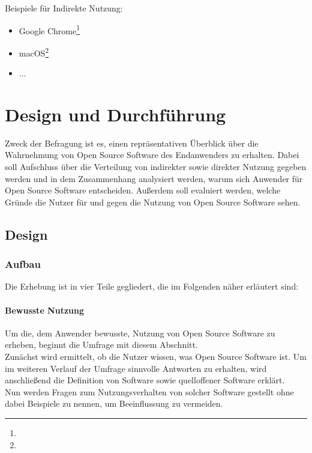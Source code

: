 \documentclass[a4paper]{article}
\begin{document}
                    Beispiele für Indirekte Nutzung:
                    \begin{itemize}
                        \item Google Chrome\footnote{}
                        \item macOS\footnote{}
                        \item ... %
                    \end{itemize}

            
        
    \section{Design und Durchführung}
		Zweck der Befragung ist es, einen repräsentativen Überblick über die Wahrnehmung von Open Source Software des Endanwenders zu erhalten. Dabei soll Aufschluss über die Verteilung von indirekter sowie direkter Nutzung gegeben werden und in dem Zusammenhang analysiert werden, warum sich Anwender für Open Source Software entscheiden. Außerdem soll evaluiert werden, welche Gründe die Nutzer für und gegen die Nutzung von Open Source Software sehen.
	
		\subsection{Design}
		  \subsubsection{Aufbau}
    			Die Erhebung ist in vier Teile gegliedert, die im Folgenden näher erläutert sind: 
    		   
    			\paragraph{Bewusste Nutzung}
    				Um die, dem Anwender bewusste, Nutzung von Open Source Software zu erheben, beginnt die Umfrage mit diesem Abschnitt.\\
    				Zunächst wird ermittelt, ob die Nutzer wissen, was Open Source Software ist. Um im weiteren Verlauf der Umfrage sinnvolle Antworten zu erhalten, wird anschließend die Definition von Software sowie quelloffener Software erklärt.\\
    				Nun werden Fragen zum Nutzungsverhalten von solcher Software gestellt ohne dabei Beispiele zu nennen, um Beeinflussung zu vermeiden.
    			
\end{document}
